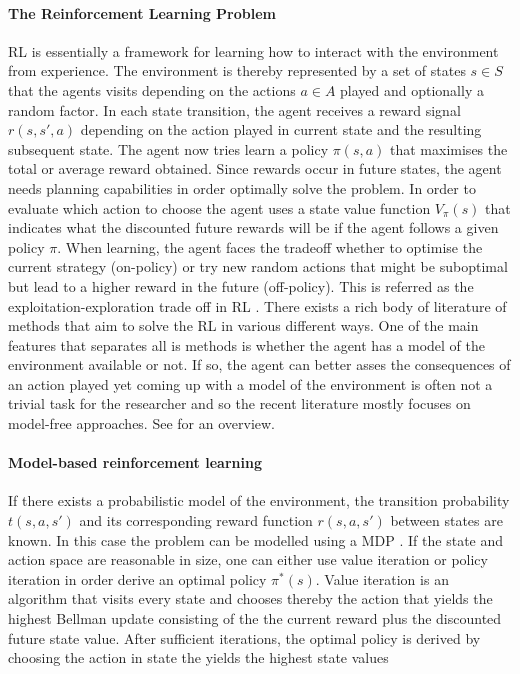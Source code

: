 \documentclass[10pt]{reportMaster}
\begin{document}
\paragraph{The Reinforcement Learning Problem} \ac{RL} is essentially a framework for learning how to interact with the environment from experience. The environment is thereby represented by a set of states $s \in S$ that the agents visits depending on the actions $a \in A$ played and optionally a random factor. In each state transition, the agent receives a reward signal $r(s, s', a)$ depending on the action played in current state and the resulting subsequent state. The agent now tries learn a policy $\pi(s, a)$ that maximises the total or average reward obtained. Since rewards occur in future states, the agent needs planning capabilities in order optimally solve the problem. In order to evaluate which action to choose the agent uses a state value function $V_{\pi}(s)$ that indicates what the discounted future rewards will be if the agent follows a given policy $\pi$. When learning, the agent faces the tradeoff whether to optimise the current strategy (on-policy) or try new random actions that might be suboptimal but lead to a higher reward in the future (off-policy). This is referred as the exploitation-exploration trade off in \ac{RL} \cite{march1991exploration}. There exists a rich body of literature of methods that aim to solve the \ac{RL} in various different ways. One of the main features that separates all is methods is whether the agent has a model of the environment available or not. If so, the agent can better asses the consequences of an action played yet coming up with a model of the environment is often not a trivial task for the researcher and so the recent literature mostly focuses on model-free approaches. See \cite{szepesvari2009reinforcement, sutton2018reinforcement} for an overview. 

\paragraph{Model-based reinforcement learning} If there exists a probabilistic model of the environment, the transition probability $t(s, a, s')$ and its corresponding reward function $r(s, a, s')$ between states are known. In this case the problem can be modelled using a \ac{MDP} \cite{bellman1957markovian}. If the state and action space are reasonable in size, one can either use value iteration or policy iteration in order derive an optimal policy $\pi^{*}(s)$. 
Value iteration is an algorithm that visits every state and chooses thereby the action that yields the highest Bellman update consisting of the the current reward plus the discounted future state value. After sufficient iterations, the optimal policy is derived by choosing the action in state the yields the highest state values
\end{document}
